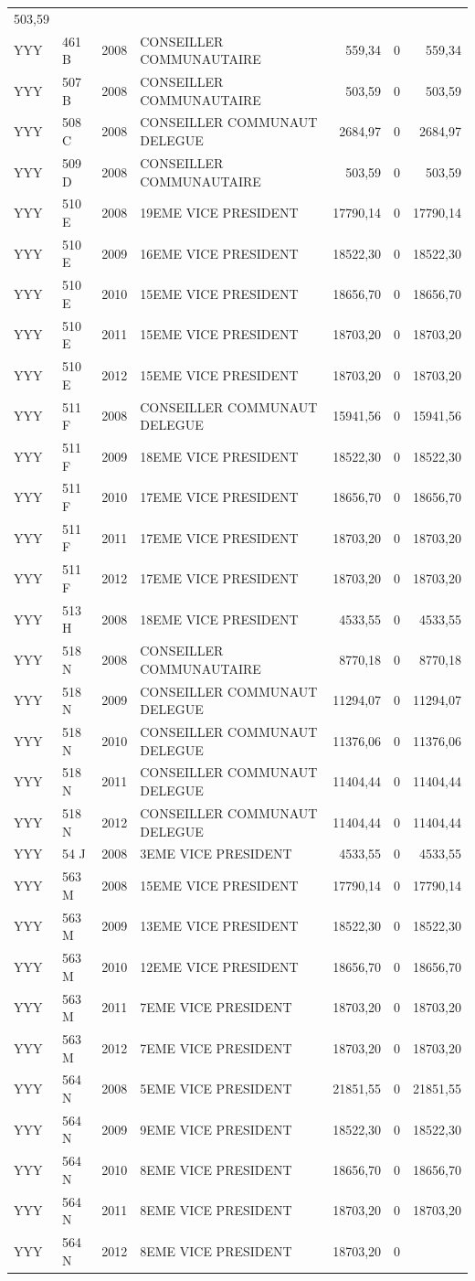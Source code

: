 \begin{longtable}[]{@{}llrlrrr@{}}
503,59\tabularnewline
YYY & 461 B & 2008 & CONSEILLER COMMUNAUTAIRE & 559,34 & 0 &
559,34\tabularnewline
YYY & 507 B & 2008 & CONSEILLER COMMUNAUTAIRE & 503,59 & 0 &
503,59\tabularnewline
YYY & 508 C & 2008 & CONSEILLER COMMUNAUT DELEGUE & 2684,97 & 0 &
2684,97\tabularnewline
YYY & 509 D & 2008 & CONSEILLER COMMUNAUTAIRE & 503,59 & 0 &
503,59\tabularnewline
YYY & 510 E & 2008 & 19EME VICE PRESIDENT & 17790,14 & 0 &
17790,14\tabularnewline
YYY & 510 E & 2009 & 16EME VICE PRESIDENT & 18522,30 & 0 &
18522,30\tabularnewline
YYY & 510 E & 2010 & 15EME VICE PRESIDENT & 18656,70 & 0 &
18656,70\tabularnewline
YYY & 510 E & 2011 & 15EME VICE PRESIDENT & 18703,20 & 0 &
18703,20\tabularnewline
YYY & 510 E & 2012 & 15EME VICE PRESIDENT & 18703,20 & 0 &
18703,20\tabularnewline
YYY & 511 F & 2008 & CONSEILLER COMMUNAUT DELEGUE & 15941,56 & 0 &
15941,56\tabularnewline
YYY & 511 F & 2009 & 18EME VICE PRESIDENT & 18522,30 & 0 &
18522,30\tabularnewline
YYY & 511 F & 2010 & 17EME VICE PRESIDENT & 18656,70 & 0 &
18656,70\tabularnewline
YYY & 511 F & 2011 & 17EME VICE PRESIDENT & 18703,20 & 0 &
18703,20\tabularnewline
YYY & 511 F & 2012 & 17EME VICE PRESIDENT & 18703,20 & 0 &
18703,20\tabularnewline
YYY & 513 H & 2008 & 18EME VICE PRESIDENT & 4533,55 & 0 &
4533,55\tabularnewline
YYY & 518 N & 2008 & CONSEILLER COMMUNAUTAIRE & 8770,18 & 0 &
8770,18\tabularnewline
YYY & 518 N & 2009 & CONSEILLER COMMUNAUT DELEGUE & 11294,07 & 0 &
11294,07\tabularnewline
YYY & 518 N & 2010 & CONSEILLER COMMUNAUT DELEGUE & 11376,06 & 0 &
11376,06\tabularnewline
YYY & 518 N & 2011 & CONSEILLER COMMUNAUT DELEGUE & 11404,44 & 0 &
11404,44\tabularnewline
YYY & 518 N & 2012 & CONSEILLER COMMUNAUT DELEGUE & 11404,44 & 0 &
11404,44\tabularnewline
YYY & 54 J & 2008 & 3EME VICE PRESIDENT & 4533,55 & 0 &
4533,55\tabularnewline
YYY & 563 M & 2008 & 15EME VICE PRESIDENT & 17790,14 & 0 &
17790,14\tabularnewline
YYY & 563 M & 2009 & 13EME VICE PRESIDENT & 18522,30 & 0 &
18522,30\tabularnewline
YYY & 563 M & 2010 & 12EME VICE PRESIDENT & 18656,70 & 0 &
18656,70\tabularnewline
YYY & 563 M & 2011 & 7EME VICE PRESIDENT & 18703,20 & 0 &
18703,20\tabularnewline
YYY & 563 M & 2012 & 7EME VICE PRESIDENT & 18703,20 & 0 &
18703,20\tabularnewline
YYY & 564 N & 2008 & 5EME VICE PRESIDENT & 21851,55 & 0 &
21851,55\tabularnewline
YYY & 564 N & 2009 & 9EME VICE PRESIDENT & 18522,30 & 0 &
18522,30\tabularnewline
YYY & 564 N & 2010 & 8EME VICE PRESIDENT & 18656,70 & 0 &
18656,70\tabularnewline
YYY & 564 N & 2011 & 8EME VICE PRESIDENT & 18703,20 & 0 &
18703,20\tabularnewline
YYY & 564 N & 2012 & 8EME VICE PRESIDENT & 18703,20 & 0 &

\end{longtable}
